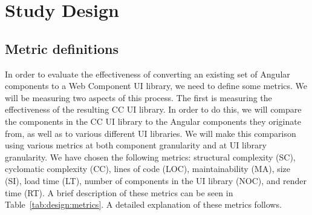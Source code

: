 \section{Study Design}\label{sec:design}

\subsection{Metric definitions}
In order to evaluate the effectiveness of converting an existing set of Angular components to a Web Component UI library, we need to define some metrics. We will be measuring two aspects of this process. The first is measuring the effectiveness of the resulting CC UI library. In order to do this, we will compare the components in the CC UI library to the Angular components they originate from, as well as to various different UI libraries. We will make this comparison using various metrics at both component granularity and at UI library granularity. We have chosen the following metrics: structural complexity (SC), cyclomatic complexity (CC), lines of code (LOC), maintainability (MA), size (SI), load time (LT), number of components in the UI library (NOC), and render time (RT). A brief description of these metrics can be seen in Table~\ref{tab:design:metrics}. A detailed explanation of these metrics follows.


